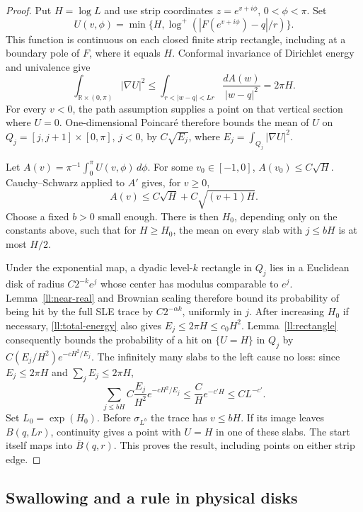 \begin{proof}
Put $H=\log L$ and use strip coordinates $z=e^{v+i\phi}$,
$0<\phi<\pi$. Set
\[
 U(v,\phi)=\min\{H,\log^+(|F(e^{v+i\phi})-q|/r)\}.
\]
This function is continuous on each closed finite strip rectangle,
including at a boundary pole of $F$, where it equals $H$.
Conformal invariance of Dirichlet energy and univalence give
\begin{equation}
 \int_{\mathbb R\times(0,\pi)}|\nabla U|^2
 \le\int_{r<|w-q|<Lr}\frac{dA(w)}{|w-q|^2}
 =2\pi H.
 \label{ll:total-energy}
\end{equation}
For every $v<0$, the path assumption supplies a point on that
vertical section where $U=0$. One-dimensional Poincar\'e therefore
bounds the mean of $U$ on
$Q_j=[j,j+1]\times[0,\pi]$, $j<0$, by $C\sqrt{E_j}$, where
$E_j=\int_{Q_j}|\nabla U|^2$.

Let $A(v)=\pi^{-1}\int_0^\pi U(v,\phi)\,d\phi$.
For some $v_0\in[-1,0]$, $A(v_0)\le C\sqrt H$.
Cauchy--Schwarz applied to $A'$ gives, for $v\ge0$,
\[
 A(v)\le C\sqrt H+C\sqrt{(v+1)H}.
\]
Choose a fixed $b>0$ small enough.  There is then $H_0$, depending only
on the constants above, such that for $H\ge H_0$,
the mean on every slab with $j\le bH$ is at most $H/2$.

Under the exponential map, a dyadic level-$k$ rectangle in $Q_j$
lies in a Euclidean disk of radius $C2^{-k}e^j$ whose center has
modulus comparable to $e^j$. Lemma~\ref{ll:near-real} and Brownian
scaling therefore bound its probability of being hit by the full
SLE trace by $C2^{-\alpha k}$, uniformly in $j$.
After increasing $H_0$ if necessary, \eqref{ll:total-energy} also gives
$E_j\le2\pi H\le c_0H^2$.
Lemma~\ref{ll:rectangle} consequently bounds the probability of a
hit on $\{U=H\}$ in $Q_j$ by
$C(E_j/H^2)e^{-cH^2/E_j}$.
The infinitely many slabs to the left cause no loss: since
$E_j\le2\pi H$ and $\sum_jE_j\le2\pi H$,
\[
 \sum_{j\le bH}C\frac{E_j}{H^2}e^{-cH^2/E_j}
 \le\frac C H e^{-c'H}\le CL^{-c'}.
\]
Set $L_0=\exp(H_0)$. Before $\sigma_{L^b}$ the trace has $v\le bH$.
If its image leaves
$B(q,Lr)$, continuity gives a point with $U=H$ in one of these
slabs. The start itself maps into $\overline B(q,r)$.
This proves the result, including points on either strip edge.
\end{proof}

\subsection{Swallowing and a rule in physical disks}

